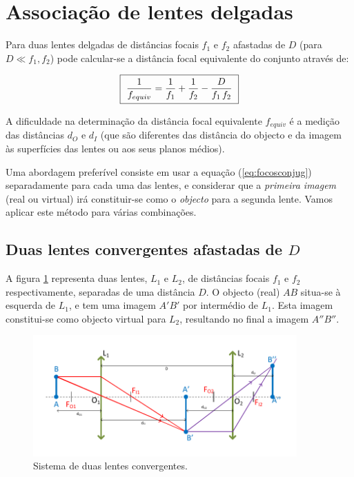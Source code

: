 \documentclass[a4paper,12pt]{article}      %
\begin{document}

\section{\sf Associação de lentes delgadas}

Para duas lentes delgadas de distâncias focais $f_1$ e $f_2$ afastadas de $D$ (para $D \ll f_1,f_2$) pode calcular-se a distância focal equivalente do conjunto através de: 

 \begin{equation}
	\label{eq:assoclentes}
    \fbox{
        $ \displaystyle
	\frac{1}{f_{equiv}} = \frac{1}{f_1} + \frac{1}{f_2} - \frac{D}{f_1 \,f_2} 
        $
    }
\end{equation}

A dificuldade
na determinação da distância focal equivalente ${f_{equiv}}$ é a medição das distâncias $d_O$ e $d_I$ 
(que são diferentes das distância do objecto e da imagem às superfícies das lentes ou aos seus planos médios).

Uma abordagem preferível consiste em usar a equação (\ref{eq:focosconjug}) separadamente para cada uma das lentes, e considerar que a \emph{primeira imagem} (real ou virtual) irá constituir-se como o \emph{objecto} para a segunda lente. Vamos aplicar este método para várias combinações.

\subsection{\sf Duas lentes convergentes afastadas de $D$}
A figura \ref{fig:DuplaConvConv1} representa duas lentes, $L_1$ e $L_2$, de distâncias focais $f_1$ e $f_2$ respectivamente, separadas de uma distância $D$. O objecto (real) $AB$ situa-se à esquerda de $L_1$, e tem uma imagem $A'B'$ por intermédio de $L_1$. Esta imagem constitui-se como objecto virtual para $L_2$, resultando no final a imagem $A''B''$.

\begin{figure}	[!htb]  \centering 
	\includegraphics[width=0.9\textwidth]{9-DuplaConvConv1}
	\caption{Sistema de duas lentes convergentes. \label{fig:DuplaConvConv1}} 
\end{figure}
\end{document}

